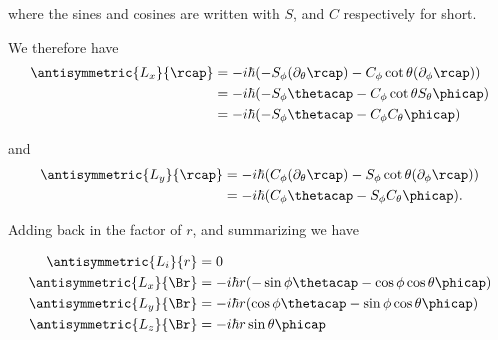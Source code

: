 where the sines and cosines are written with $S$, and $C$ respectively for short.

We therefore have
\begin{align*}
\antisymmetric{L_x}{\rcap}
&= -i \hbar (-S_\phi (\partial_\theta \rcap) - C_\phi \cot\theta (\partial_\phi \rcap) ) \\
&= -i \hbar (-S_\phi \thetacap - C_\phi \cot\theta S_\theta \phicap ) \\
&= -i \hbar (-S_\phi \thetacap - C_\phi C_\theta \phicap ) \\
\end{align*}

and
\begin{align*}
\antisymmetric{L_y}{\rcap}
&= -i \hbar (C_\phi (\partial_\theta \rcap) - S_\phi \cot\theta (\partial_\phi \rcap)) \\
&= -i \hbar (C_\phi \thetacap - S_\phi C_\theta \phicap ).
\end{align*}

Adding back in the factor of $r$, and summarizing we have

\begin{align}\label{eqn:desaiCh4:620}
\antisymmetric{L_i}{r} &= 0 \\
\antisymmetric{L_x}{\Br} &= -i \hbar r (-\sin\phi \thetacap - \cos\phi \cos\theta \phicap ) \\
\antisymmetric{L_y}{\Br} &= -i \hbar r (\cos\phi \thetacap - \sin\phi \cos\theta \phicap ) \\
\antisymmetric{L_z}{\Br} &= -i \hbar r \sin\theta \phicap
\end{align}

%
%
%
%
